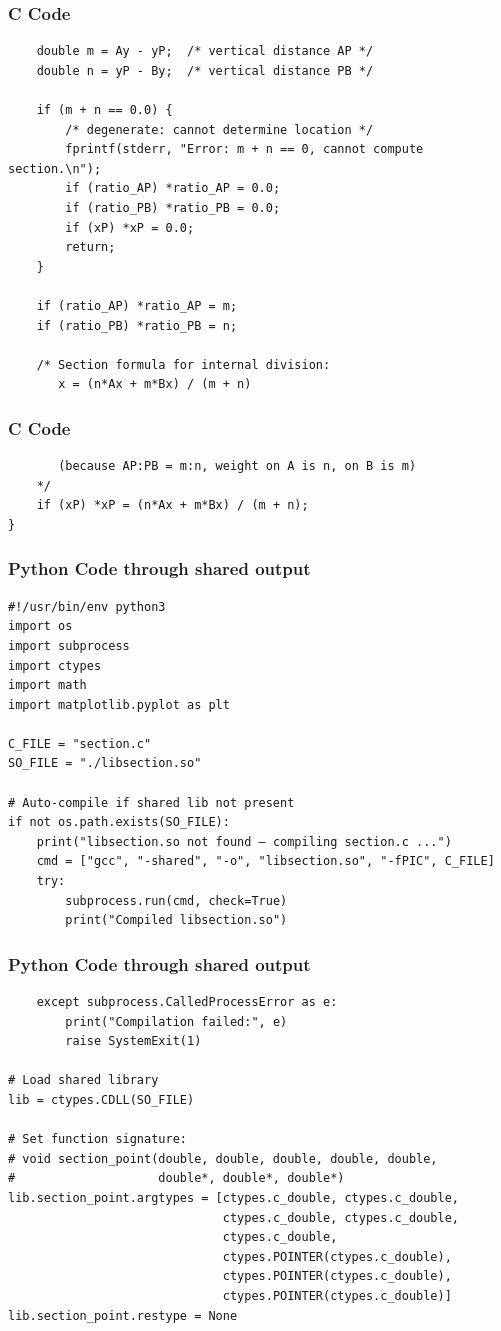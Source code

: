 \documentclass{beamer}
\begin{document}
\begin{frame}[fragile]
\frametitle{C Code }
\begin{lstlisting}
    double m = Ay - yP;  /* vertical distance AP */
    double n = yP - By;  /* vertical distance PB */

    if (m + n == 0.0) {
        /* degenerate: cannot determine location */
        fprintf(stderr, "Error: m + n == 0, cannot compute section.\n");
        if (ratio_AP) *ratio_AP = 0.0;
        if (ratio_PB) *ratio_PB = 0.0;
        if (xP) *xP = 0.0;
        return;
    }

    if (ratio_AP) *ratio_AP = m;
    if (ratio_PB) *ratio_PB = n;

    /* Section formula for internal division:
       x = (n*Ax + m*Bx) / (m + n)
\end{lstlisting}
\end{frame}
\begin{frame}[fragile]
\frametitle{C Code }
\begin{lstlisting}
       (because AP:PB = m:n, weight on A is n, on B is m)
    */
    if (xP) *xP = (n*Ax + m*Bx) / (m + n);
}
\end{lstlisting}
\end{frame}
\begin{frame}[fragile]
	\frametitle{Python Code through shared output}
	\begin{lstlisting}
#!/usr/bin/env python3
import os
import subprocess
import ctypes
import math
import matplotlib.pyplot as plt

C_FILE = "section.c"
SO_FILE = "./libsection.so"

# Auto-compile if shared lib not present
if not os.path.exists(SO_FILE):
    print("libsection.so not found — compiling section.c ...")
    cmd = ["gcc", "-shared", "-o", "libsection.so", "-fPIC", C_FILE]
    try:
        subprocess.run(cmd, check=True)
        print("Compiled libsection.so")
\end{lstlisting}
\end{frame}
\begin{frame}[fragile]
	\frametitle{Python Code through shared output}
	\begin{lstlisting}
    except subprocess.CalledProcessError as e:
        print("Compilation failed:", e)
        raise SystemExit(1)

# Load shared library
lib = ctypes.CDLL(SO_FILE)

# Set function signature:
# void section_point(double, double, double, double, double,
#                    double*, double*, double*)
lib.section_point.argtypes = [ctypes.c_double, ctypes.c_double,
                              ctypes.c_double, ctypes.c_double,
                              ctypes.c_double,
                              ctypes.POINTER(ctypes.c_double),
                              ctypes.POINTER(ctypes.c_double),
                              ctypes.POINTER(ctypes.c_double)]
lib.section_point.restype = None
\end{lstlisting}
\end{frame}
\end{document}
